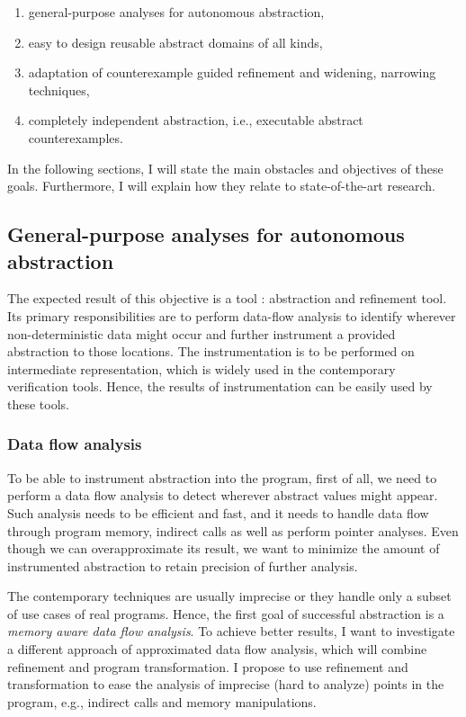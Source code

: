 \begin{enumerate}
    \item general-purpose analyses for autonomous abstraction,
    \item easy to design reusable abstract domains of all kinds,
    \item adaptation of counterexample guided refinement and widening, narrowing techniques,
    \item completely independent abstraction, i.e., executable abstract counterexamples.
\end{enumerate}

\noindent
In the following sections, I will state the main obstacles and objectives of
these goals. Furthermore, I will explain how they relate to state-of-the-art
research.

\subsection{General-purpose analyses for autonomous abstraction}

The expected result of this objective is a tool \lart: \llvm abstraction and
refinement tool. Its primary responsibilities are to perform data-flow analysis
to identify wherever non-deterministic data might occur and further instrument
a provided abstraction to those locations.  The instrumentation is to be
performed on \llvm intermediate representation, which is widely used in the
contemporary verification tools. Hence, the results of instrumentation can be
easily used by these tools.

\subsubsection{Data flow analysis}

To be able to instrument abstraction into the program, first of all, we need to
perform a data flow analysis to detect wherever abstract values might appear.
Such analysis needs to be efficient and fast, and it needs to handle data flow
through program memory, indirect calls as well as perform pointer analyses. Even though we can
overapproximate its result, we want to minimize the amount of instrumented
abstraction to retain precision of further analysis.

The contemporary techniques are usually imprecise or they handle only a subset of use
cases of real programs. Hence, the first goal of successful abstraction is a
\emph{memory aware data flow analysis}. To achieve better results, I want to
investigate a different approach of approximated data flow analysis, which will
combine refinement and program transformation. I propose to use refinement
and transformation to ease the analysis of imprecise (hard to analyze) points
in the program, e.g., indirect calls and memory manipulations.

